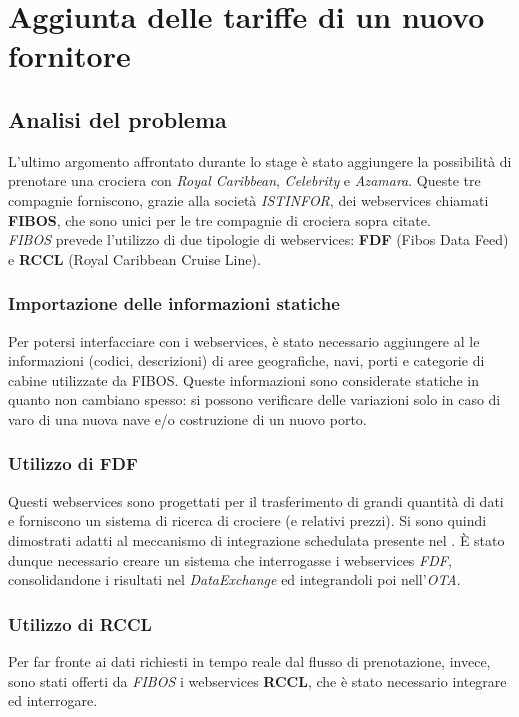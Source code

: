 \section{Aggiunta delle tariffe di un nuovo fornitore}
\subsection{Analisi del problema}
L'ultimo argomento affrontato durante lo stage è stato aggiungere la possibilità di prenotare una crociera con \textit{Royal Caribbean}, \textit{Celebrity} e \textit{Azamara}. Queste tre compagnie forniscono, grazie alla società \textit{ISTINFOR}, dei \glspl{webservice} chiamati \textbf{FIBOS}, che sono unici per le tre compagnie di crociera sopra citate. \\
\textit{FIBOS} prevede l'utilizzo di due tipologie di \glspl{webservice}: \textbf{FDF} (Fibos Data Feed) e \textbf{RCCL} (Royal Caribbean Cruise Line).
\subsubsection{Importazione delle informazioni statiche}
Per potersi interfacciare con i \glspl{webservice}, è stato necessario aggiungere al \bookingEngine\hphantom{i}le informazioni (codici, descrizioni) di aree geografiche, navi, porti e categorie di cabine utilizzate da FIBOS. Queste informazioni sono considerate statiche in quanto non cambiano spesso: si possono verificare delle variazioni solo in caso di varo di una nuova nave e/o costruzione di un nuovo porto.

\subsubsection{Utilizzo di FDF}
Questi \glspl{webservice} sono progettati per il trasferimento di grandi quantità di dati e forniscono un sistema di ricerca di crociere (e relativi prezzi). Si sono quindi dimostrati adatti al meccanismo di integrazione schedulata presente nel \bookingEngine. È stato dunque necessario creare un sistema che interrogasse i \glspl{webservice} \textit{FDF}, consolidandone i risultati nel \textit{DataExchange} ed integrandoli poi nell'\textit{OTA}. 

\subsubsection{Utilizzo di RCCL}
Per far fronte ai dati richiesti in tempo reale dal flusso di prenotazione, invece, sono stati offerti da \textit{FIBOS} i \glspl{webservice} \textbf{RCCL}, che è stato necessario integrare ed interrogare.

